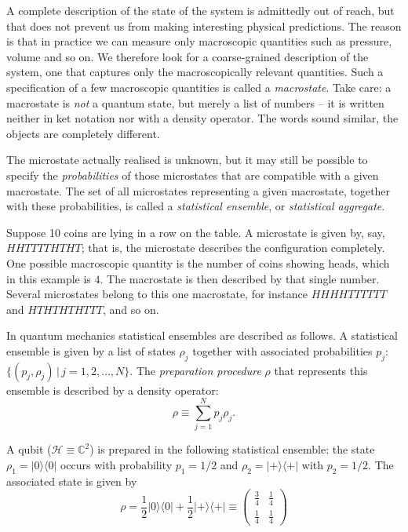 A complete description of the state of the system is admittedly out of reach, but that does not prevent us from making interesting physical predictions. The reason is that in practice we can measure only macroscopic quantities such as pressure, volume and so on. We therefore look for a coarse-grained description of the system, one that captures only the macroscopically relevant quantities. Such a specification of a few macroscopic quantities is called a \emph{macrostate}. Take care: a macrostate is \emph{not} a quantum state, but merely a list of numbers -- it is written neither in ket notation nor with a density operator. The words sound similar, the objects are completely different.

The microstate actually realised is unknown, but it may still be possible to specify the \emph{probabilities} of those microstates that are compatible with a given macrostate. The set of all microstates representing a given macrostate, together with these probabilities, is called a \emph{statistical ensemble}, or \emph{statistical aggregate}.

\begin{example}
  Suppose 10 coins are lying in a row on the table. A microstate is given by, say, $HHTTTTHTHT$; that is, the microstate describes the configuration completely. One possible macroscopic quantity is the number of coins showing heads, which in this example is $4$. The macrostate is then described by that single number. Several microstates belong to this one macrostate, for instance $HHHHTTTTTT$ and $HTHTHTHTTT$, and so on.
\end{example}

In quantum mechanics statistical ensembles are described as follows. A statistical ensemble is given by a list of states $\rho_j$ together with associated probabilities $p_j$: $\{(p_j,\rho_j)\,|\, j=1,2, \ldots, N\}$. The \emph{preparation procedure} $\rho$ that represents this ensemble is described by a density operator:
\begin{equation}
  \rho \equiv \sum_{j=1}^N p_j \rho_j.
\end{equation}

\begin{example}
  A qubit ($\mathcal{H}\equiv \mathbb{C}^2$) is prepared in the following statistical ensemble: the state $\rho_1 = |0\rangle\langle 0|$ occurs with probability $p_1=1/2$ and $\rho_2 = |+\rangle\langle +|$ with $p_2 = 1/2$. The associated state is given by
  \begin{equation}
    \rho = \frac12 |0\rangle\langle 0| + \frac12|+\rangle\langle+| \equiv \begin{pmatrix}
      \frac34 & \frac14 \\ \frac14 & \frac14
    \end{pmatrix}
  \end{equation}
\end{example}

